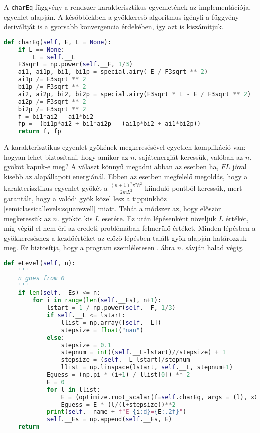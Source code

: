 A \texttt{charEq} függvény a rendszer karakterisztikus egyenletének az implementációja,  egyenlet alapján. A későbbiekben a gyökkereső algoritmus igényli a függvény deriváltját is a gyorsabb konvergencia érdekében, így azt is kiszámítjuk.
\begin{lstlisting}[language=Python]
def charEq(self, E, L = None):
    if L == None:
        L = self.__L
    F3sqrt = np.power(self.__F, 1/3)
    ai1, ai1p, bi1, bi1p = special.airy(-E / F3sqrt ** 2)
    ai1p /= F3sqrt ** 2
    bi1p /= F3sqrt ** 2
    ai2, ai2p, bi2, bi2p = special.airy(F3sqrt * L - E / F3sqrt ** 2)
    ai2p /= F3sqrt ** 2
    bi2p /= F3sqrt ** 2
    f = bi1*ai2 - ai1*bi2
    fp = -(bi1p*ai2 + bi1*ai2p - (ai1p*bi2 + ai1*bi2p))
    return f, fp
\end{lstlisting}
A karakterisztikus egyenlet gyökének megkeresésével egyetlen komplikáció van: hogyan lehet biztosítani, hogy amikor az $n$. sajátenergiát keressük, valóban az $n$. gyököt kapuk-e meg? A választ könnyű megadni abban az esetben ha, $FL$ jóval kisebb az alapállapoti energiánál. Ebben az esetben megfelelő megoldás, hogy a karakterisztikus egyenlet gyökét a $\frac{(n+1)^2\pi^2\hbar^2}{2mL^2}$ kiinduló pontból keressük, mert garantált, hogy a valódi gyök közel lesz a tippünkhöz \eqref{semiclassicallevels:squarewell} miatt. Tehát a módszer az, hogy először megkeressük az $n$. gyököt kis $L$ esetére. Ez után lépésenként növeljük $L$ értékét, míg végül el nem éri az eredeti problémában felmerülő értéket. Minden lépésben a gyökkereséshez a kezdőértéket az előző lépésben talált gyök alapján határozzuk meg. Ez biztosítja, hogy a program szemléletesen  . ábra $n$. sávján halad végig.
\begin{lstlisting}[language=Python]
def eLevel(self, n):
    '''
    n goes from 0
    '''
    if len(self.__Es) <= n:
        for i in range(len(self.__Es), n+1):
            lstart = 1 / np.power(self.__F, 1/3)
            if self.__L <= lstart:
                llist = np.array([self.__L])
                stepsize = float("nan")
            else:
                stepsize = 0.1
                stepnum = int((self.__L-lstart)//stepsize) + 1
                stepsize = (self.__L-lstart)/stepnum
                llist = np.linspace(lstart, self.__L, stepnum+1)
            Eguess = (np.pi * (i+1) / llist[0]) ** 2
            E = 0
            for l in llist:
                E = (optimize.root_scalar(f=self.charEq, args = (l), x0=Eguess, fprime=True)).root
                Eguess = E * (l/(l+stepsize))**2
            print(self.__name + f"E_{i:d}={E:.2f}")
            self.__Es = np.append(self.__Es, E)
    return
\end{lstlisting}
